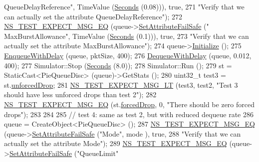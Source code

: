 \begin{DoxyCode}
{      QueueDelayReference"}, TimeValue (\hyperlink{group__timecivil_ga33c34b816f8ff6628e33d5c8e9713b9e}{Seconds} (0.08))), \textcolor{keyword}{true},
271                          \textcolor{stringliteral}{"Verify that we can actually set the attribute QueueDelayReference"});
272   \hyperlink{group__testing_ga7304ba46a28d8cf08dfdfd6499cf7068}{NS\_TEST\_EXPECT\_MSG\_EQ} (queue->\hyperlink{classns3_1_1ObjectBase_aa7d333004e970f925a4ed5df275541b5}{SetAttributeFailSafe} (\textcolor{stringliteral}{"
      MaxBurstAllowance"}, TimeValue (\hyperlink{group__timecivil_ga33c34b816f8ff6628e33d5c8e9713b9e}{Seconds} (0.1))), \textcolor{keyword}{true},
273                          \textcolor{stringliteral}{"Verify that we can actually set the attribute MaxBurstAllowance"});
274   queue->\hyperlink{classns3_1_1Object_af4411cb29971772fcd09203474a95078}{Initialize} ();
275   \hyperlink{classPieQueueDiscTestCase_a6d837dbfe3af8f4a7a1ca4e6ecbbf54e}{EnqueueWithDelay} (queue, pktSize, 400);
276   \hyperlink{classPieQueueDiscTestCase_ac95d22c3ac6ef3a873d70a663fd964e3}{DequeueWithDelay} (queue, 0.012, 400);
277   Simulator::Stop (\hyperlink{group__timecivil_ga33c34b816f8ff6628e33d5c8e9713b9e}{Seconds} (8.0));
278   Simulator::Run ();
279   st = StaticCast<PieQueueDisc> (queue)->GetStats ();
280   uint32\_t test3 = st.\hyperlink{structns3_1_1PieQueueDisc_1_1Stats_afe4c9f6e4c910cf47d475ff5d29d5bb0}{unforcedDrop};
281   \hyperlink{group__testing_ga5e7f81b9d00df9c727e6281e1b1bbc55}{NS\_TEST\_EXPECT\_MSG\_LT} (test3, test2, \textcolor{stringliteral}{"Test 3 should have less unforced drops than
       test 2"});
282   \hyperlink{group__testing_ga7304ba46a28d8cf08dfdfd6499cf7068}{NS\_TEST\_EXPECT\_MSG\_EQ} (st.\hyperlink{structns3_1_1PieQueueDisc_1_1Stats_a40eea66d9bc2ce766df9390776eb88a9}{forcedDrop}, 0, \textcolor{stringliteral}{"There should be zero forced
       drops"});
283 
284 
285   \textcolor{comment}{// test 4: same as test 2, but with reduced dequeue rate}
286   queue = CreateObject<PieQueueDisc> ();
287   \hyperlink{group__testing_ga7304ba46a28d8cf08dfdfd6499cf7068}{NS\_TEST\_EXPECT\_MSG\_EQ} (queue->\hyperlink{classns3_1_1ObjectBase_aa7d333004e970f925a4ed5df275541b5}{SetAttributeFailSafe} (\textcolor{stringliteral}{"Mode"}, mode
      ), \textcolor{keyword}{true},
288                          \textcolor{stringliteral}{"Verify that we can actually set the attribute Mode"});
289   \hyperlink{group__testing_ga7304ba46a28d8cf08dfdfd6499cf7068}{NS\_TEST\_EXPECT\_MSG\_EQ} (queue->\hyperlink{classns3_1_1ObjectBase_aa7d333004e970f925a4ed5df275541b5}{SetAttributeFailSafe} (\textcolor{stringliteral}{"QueueLimit"}

\end{DoxyCode}
